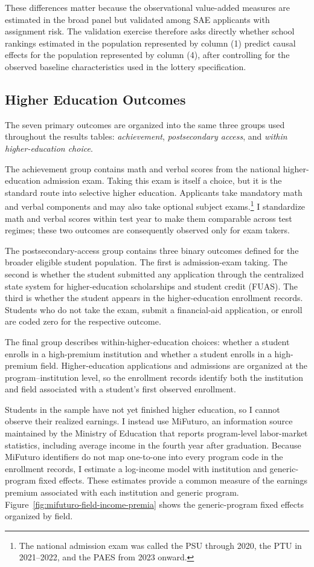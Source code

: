 \documentclass[a4paper, article, english, oneside, unknownkeysallowed, 12pt]{memoir}
\begin{document}
These differences matter because the observational value-added measures are estimated in the broad panel but validated among SAE applicants with assignment risk.
The validation exercise therefore asks directly whether school rankings estimated in the population represented by column (1) predict causal effects for the population represented by column (4), after controlling for the observed baseline characteristics used in the lottery specification.


\subsection{Higher Education Outcomes}

The seven primary outcomes are organized into the same three groups used throughout the results tables: \textit{achievement}, \textit{postsecondary access}, and \textit{within higher-education choice}.

The achievement group contains math and verbal scores from the national higher-education admission exam.
Taking this exam is itself a choice, but it is the standard route into selective higher education.
Applicants take mandatory math and verbal components and may also take optional subject exams.\footnote{The national admission exam was called the PSU through 2020, the PTU in 2021--2022, and the PAES from 2023 onward.}
I standardize math and verbal scores within test year to make them comparable across test regimes; these two outcomes are consequently observed only for exam takers.

The postsecondary-access group contains three binary outcomes defined for the broader eligible student population.
The first is admission-exam taking.
The second is whether the student submitted any application through the centralized state system for higher-education scholarships and student credit (FUAS).
The third is whether the student appears in the higher-education enrollment records.
Students who do not take the exam, submit a financial-aid application, or enroll are coded zero for the respective outcome.

The final group describes within-higher-education choices: whether a student enrolls in a high-premium institution and whether a student enrolls in a high-premium field.
Higher-education applications and admissions are organized at the program--institution level, so the enrollment records identify both the institution and field associated with a student's first observed enrollment.

Students in the sample have not yet finished higher education, so I cannot observe their realized earnings.
I instead use MiFuturo, an information source maintained by the Ministry of Education that reports program-level labor-market statistics, including average income in the fourth year after graduation.
Because MiFuturo identifiers do not map one-to-one into every program code in the enrollment records, I estimate a log-income model with institution and generic-program fixed effects.
These estimates provide a common measure of the earnings premium associated with each institution and generic program.
Figure~\ref{fig:mifuturo-field-income-premia} shows the generic-program fixed effects organized by field.
\end{document}
